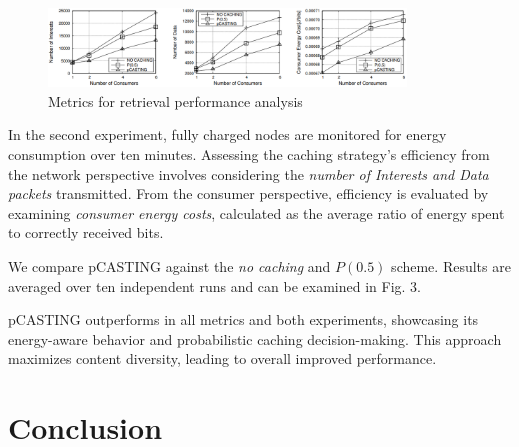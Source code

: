 \documentclass[conference]{IEEEtran}
\begin{document}
\begin{figure}[htbp]
    \centerline{\includegraphics[width=9.5cm]{fig3.png}}
    \caption{Metrics for retrieval performance analysis}
    \label{fig3}
\end{figure}

In the second experiment, fully charged nodes are monitored for energy consumption over ten minutes. Assessing the caching 
strategy's efficiency from the network perspective involves considering the \textit{number of Interests and Data packets} transmitted. 
From the consumer perspective, efficiency is evaluated by examining \textit{consumer energy costs}, calculated as the average ratio of 
energy spent to correctly received bits.

We compare pCASTING against the \textit{no caching} and $P(0.5)$ scheme. Results are averaged over ten independent runs
and can be examined in Fig. 3.



pCASTING outperforms in all metrics and both experiments, showcasing its energy-aware behavior and probabilistic 
caching decision-making. This approach maximizes content diversity, leading to overall improved performance.


\section{Conclusion}
\end{document}
